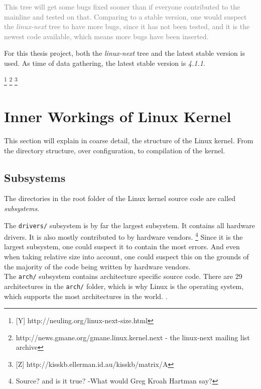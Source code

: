 \documentclass[a4paper,11pt]{report}
\newcommand{\figa}{
    \begin{figure}[!htpb]
    \centering
}
\newcommand{\figb}[2]{
    \caption{#1}
    \label{#2}
    \end{figure}
}
\begin{document}
\textcolor{gray}{
This tree will get some bugs fixed sooner than if everyone contributed to the 
mainline and tested on that. Comparing to a stable version, one would suspect 
the \emph{linux-next} tree to have more bugs, since it has not been tested, 
and it is the newest code available, which means more bugs have been inserted.
}

For this thesis project, both the \emph{linux-next} tree and the latest stable 
version is used. As time of data gathering, the latest stable version is 
\emph{4.1.1}.

    \footnote{[Y] http://neuling.org/linux-next-size.html}
    \footnote{http://news.gmane.org/gmane.linux.kernel.next - the linux-next 
        mailing list archive}
    \footnote{[Z] http://kisskb.ellerman.id.au/kisskb/matrix/A}


        \section{Inner Workings of Linux Kernel}

This section will explain in coarse detail, the structure of the Linux kernel.
From the directory structure, over configuration, to compilation of the kernel.


        \subsection{Subsystems}

The directories in the root folder of the Linux kernel source code are called 
\emph{subsystems}. 


The \texttt{drivers/} subsystem is by far the largest subsystem. It contains 
all hardware drivers. It is also mostly contributed to by hardware vendors.
    \footnote{Source? and is it true? -What would Greg Kroah Hartman say?}
Since it is the largest subsystem, one could suspect it to contain the most 
errors. And even when taking relative size into account, one could suspect this
on the grounds of the majority of the code being written by hardware vendors.
\\

The \texttt{arch/} subsystem contains architecture specific source code. 
There are 29 architectures in the \texttt{arch/} folder, which is why Linux is 
the operating system, which supports the most architectures in the world.
    \cite{22thbirthday}
.
\\
\end{document}
